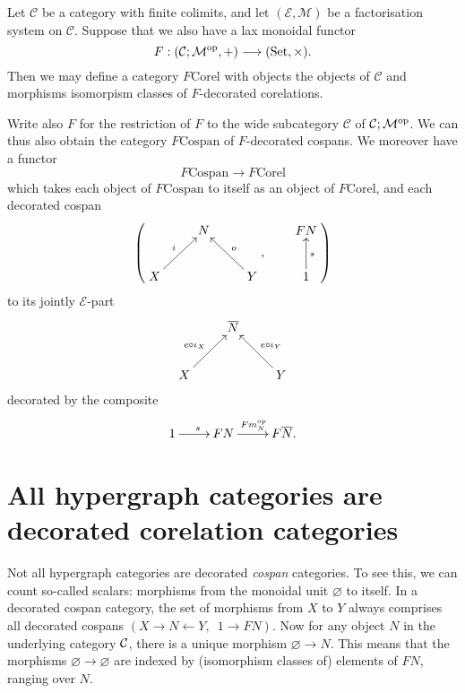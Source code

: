 \begin{corollary}
  Let $\mathcal C$ be a category with finite colimits, and let $(\mathcal E,
  \mathcal M)$ be a factorisation system on $\mathcal C$. Suppose that we also
  have a lax monoidal functor
  \[
    F: (\mathcal C;\mathcal M^{\mathrm{op}},+) \longrightarrow (\mathrm{Set}, \times).
  \]
  Then we may define a category $F\mathrm{Corel}$ with objects the objects of
  $\mathcal C$ and morphisms isomorpism classes of $F$-decorated corelations.

  Write also $F$ for the restriction of $F$ to the wide subcategory $\mathcal
  C$ of $\mathcal C;\mathcal M^{\mathrm{op}}$. We can thus also obtain the category
  $F\mathrm{Cospan}$ of
  $F$-decorated cospans. We moreover have a functor 
  \[
    F\mathrm{Cospan} \to F\mathrm{Corel}
  \]
  which takes each object of $F\mathrm{Cospan}$ to itself as an object of
  $F\mathrm{Corel}$, and each decorated cospan
  \[
    \left(
    \begin{aligned}
      \xymatrix{
	& N \\  
	X \ar[ur]^{i} && Y \ar[ul]_{o}
      }
    \end{aligned}
    ,
    \qquad
    \begin{aligned}
      \xymatrix{
	FN \\
	1 \ar[u]_{s}
      }
    \end{aligned}
    \right)
  \]  
  to its jointly $\mathcal E$-part
  \[
    \xymatrix{
      & \overline{N} \\  
      X \ar[ur]^{e\circ \iota_X} && Y \ar[ul]_{e\circ\iota_Y}
    }
  \]
  decorated by the composite
  \[
    \xymatrix{
      1 \ar[r]^s & FN \ar[r]^{Fm_N^\opp} & F\overline{N}.
    }
  \]
\end{corollary}


\section{All hypergraph categories are decorated corelation categories}
\label{sec.allhypergraphs}

Not all hypergraph categories are decorated \emph{cospan} categories. To see
this, we can count so-called scalars: morphisms from the monoidal unit
$\varnothing$ to itself. In a decorated cospan category, the set of morphisms
from $X$ to $Y$ always comprises all decorated cospans $(X \to N \leftarrow
Y,\enspace 1 \to FN)$. Now for any object $N$ in the underlying category $\mathcal
C$, there is a unique morphism $\varnothing \to N$. This means that the
morphisms $\varnothing \to \varnothing$ are indexed by (isomorphism classes of)
elements of $FN$, ranging over $N$.

